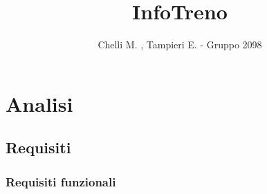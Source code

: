 \documentclass[a4paper,12pt]{report}
\title{InfoTreno}
\author{Chelli M. \cite{915585}, Tampieri E.\cite{915602} - Gruppo 2098}
\begin{document}
    \maketitle
    \tableofcontents
    \chapter{Analisi}
    \section{Requisiti}
    \subsection{Requisiti funzionali}
    \printbibliography[heading=bibintoc]
\end{document}
